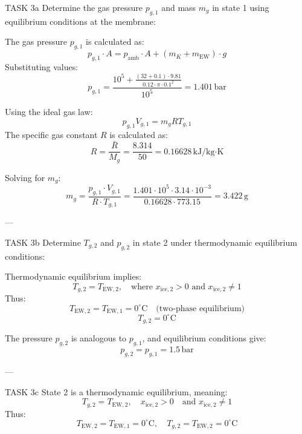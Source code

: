 TASK 3a  
Determine the gas pressure \( p_{g,1} \) and mass \( m_g \) in state 1 using equilibrium conditions at the membrane:  

The gas pressure \( p_{g,1} \) is calculated as:  
\[
p_{g,1} \cdot A = p_{\text{amb}} \cdot A + (m_K + m_{\text{EW}}) \cdot g
\]  
Substituting values:  
\[
p_{g,1} = \frac{10^5 + \frac{(32 + 0.1) \cdot 9.81}{0.12 \cdot \pi \cdot 0.1^2}}{10^5} = 1.401 \, \text{bar}
\]  

Using the ideal gas law:  
\[
p_{g,1} V_{g,1} = m_g R T_{g,1}
\]  
The specific gas constant \( R \) is calculated as:  
\[
R = \frac{\bar{R}}{M_g} = \frac{8.314}{50} = 0.16628 \, \text{kJ/kg·K}
\]  

Solving for \( m_g \):  
\[
m_g = \frac{p_{g,1} \cdot V_{g,1}}{R \cdot T_{g,1}} = \frac{1.401 \cdot 10^5 \cdot 3.14 \cdot 10^{-3}}{0.16628 \cdot 773.15} = 3.422 \, \text{g}
\]  

---

TASK 3b  
Determine \( T_{g,2} \) and \( p_{g,2} \) in state 2 under thermodynamic equilibrium conditions:  

Thermodynamic equilibrium implies:  
\[
T_{g,2} = T_{\text{EW},2}, \quad \text{where } x_{\text{ice},2} > 0 \text{ and } x_{\text{ice},2} \neq 1
\]  
Thus:  
\[
T_{\text{EW},2} = T_{\text{EW},1} = 0^\circ\text{C} \quad \text{(two-phase equilibrium)}
\]  
\[
T_{g,2} = 0^\circ\text{C}
\]  

The pressure \( p_{g,2} \) is analogous to \( p_{g,1} \), and equilibrium conditions give:  
\[
p_{g,2} = p_{g,1} = 1.5 \, \text{bar}
\]  

---

TASK 3c  
State 2 is a thermodynamic equilibrium, meaning:  
\[
T_{g,2} = T_{\text{EW},2}, \quad x_{\text{ice},2} > 0 \quad \text{and } x_{\text{ice},2} \neq 1
\]  
Thus:  
\[
T_{\text{EW},2} = T_{\text{EW},1} = 0^\circ\text{C}, \quad T_{g,2} = T_{\text{EW},2} = 0^\circ\text{C}
\]